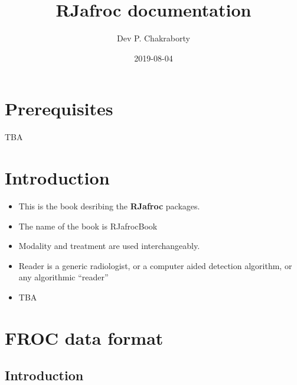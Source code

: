 \documentclass[]{book}
\title{RJafroc documentation}
\author{Dev P. Chakraborty}
\date{2019-08-04}
\providecommand{\tightlist}{%
  \setlength{\itemsep}{0pt}\setlength{\parskip}{0pt}}
\begin{document}
\maketitle

{
\setcounter{tocdepth}{1}
\tableofcontents
}
\hypertarget{prerequisites}{%
\chapter{Prerequisites}\label{prerequisites}}

TBA

\hypertarget{intro}{%
\chapter{Introduction}\label{intro}}

\begin{itemize}
\tightlist
\item
  This is the book desribing the \textbf{RJafroc} packages.
\item
  The name of the book is RJafrocBook
\item
  Modality and treatment are used interchangeably.
\item
  Reader is a generic radiologist, or a computer aided detection algorithm, or any algorithmic ``reader''
\item
  TBA
\end{itemize}

\hypertarget{frocdataformat}{%
\chapter{FROC data format}\label{frocdataformat}}

\hypertarget{introduction}{%
\section{Introduction}\label{introduction}}
\end{document}
